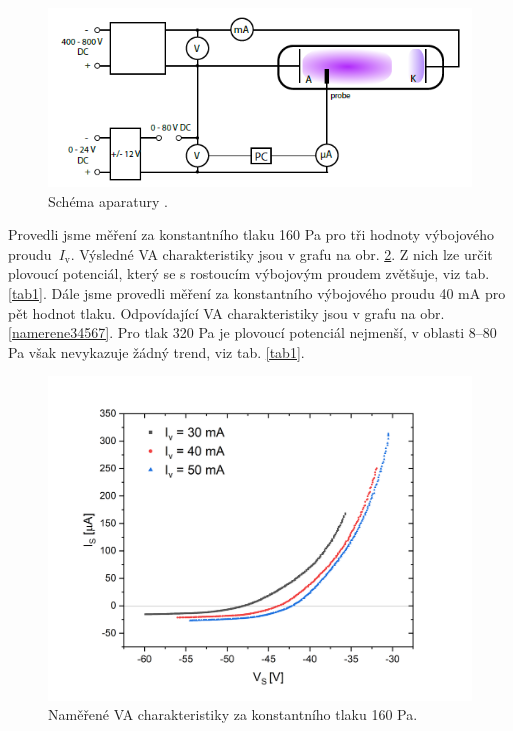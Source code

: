 \documentclass[a4paper,12pt]{article}
\begin{document}
\begin{figure}[h]
	\centering
	\includegraphics[width=120mm]{schema.png}
	\caption{Schéma aparatury \cite{VA}.}
	\label{schema}
\end{figure}

Provedli jsme měření za konstantního tlaku 160 \si{\pascal} pro tři hodnoty výbojového proudu~$I_\text{v}$. Výsledné VA charakteristiky
jsou v grafu na obr. \ref{namerene012}. Z nich lze určit plovoucí potenciál, který se s rostoucím výbojovým proudem zvětšuje, viz tab.
\ref{tab1}. Dále jsme provedli měření za konstantního výbojového proudu 40 \si{\milli\ampere} pro pět hodnot tlaku. Odpovídající VA
charakteristiky jsou v grafu na obr. \ref{namerene34567}. Pro tlak 320 \si{\pascal} je plovoucí potenciál nejmenší, v oblasti 8--80
\si{\pascal} však nevykazuje žádný trend, viz tab. \ref{tab1}.

\begin{figure}[h!]
	\centering
	\includegraphics[width=145mm]{namerene012.png}
	\caption{Naměřené VA charakteristiky za konstantního tlaku 160 \si{\pascal}.}
	\label{namerene012}	
\end{figure}
\end{document}
